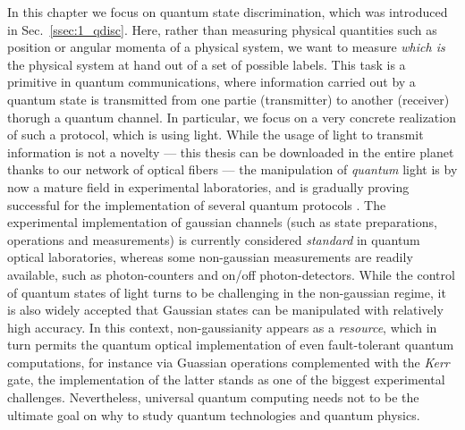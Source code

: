 In this chapter we focus on quantum state discrimination, which was introduced in Sec.~\ref{ssec:1_qdisc}. Here, rather than measuring physical quantities such as position or angular momenta of a physical system, we want to measure \textit{which is} the physical system at hand out of a set of possible labels. %
This task is a primitive in quantum communications, where information carried out by a quantum state is transmitted from one partie (transmitter) to another (receiver) thorugh a quantum channel. In particular, we focus on a very concrete realization of such a protocol, which is using light. While the usage of light to transmit information is not a novelty --- this thesis can be downloaded in the entire planet thanks to our network of optical fibers --- the manipulation of \textit{quantum} light is by now a mature field in experimental laboratories, and is gradually proving successful for the implementation of several quantum protocols \cite{qprots_cv}.%
The experimental implementation of gaussian channels (such as state preparations, operations and measurements) is currently considered \textit{standard} in quantum optical laboratories, whereas some non-gaussian measurements are readily available, such as photon-counters and on/off photon-detectors. While the control of quantum states of light turns to be challenging in the non-gaussian regime, it is also widely accepted that Gaussian states can be manipulated with relatively high accuracy. In this context, non-gaussianity appears as a \textit{resource}, which in turn permits the quantum optical implementation of even fault-tolerant quantum computations, for instance via Guassian operations complemented with the \textit{Kerr} gate, the implementation of the latter stands as one of the biggest experimental challenges. Nevertheless, universal quantum computing needs not to be the ultimate goal on why to study quantum technologies and quantum physics.%

